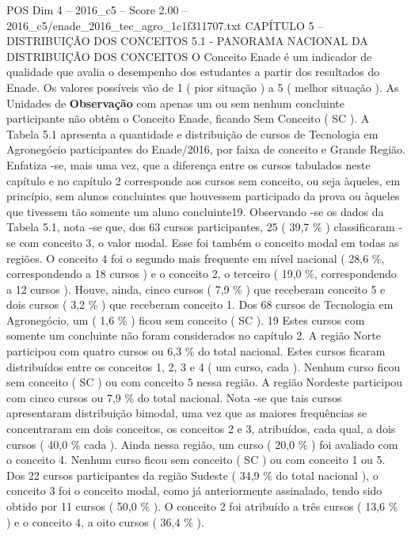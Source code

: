 \begin{textsample}{POS Dim 4 – 2016\_c5 – Score 2.00 – 2016\_c5/enade\_2016\_tec\_agro\_1c1f311707.txt}  \label{ex:f4_pos_109}
CAPÍTULO 5 – DISTRIBUIÇÃO DOS CONCEITOS 5.1 - PANORAMA NACIONAL DA DISTRIBUIÇÃO DOS CONCEITOS O Conceito Enade é um indicador de qualidade que avalia o desempenho dos estudantes a partir dos resultados do Enade.
Os valores possíveis vão de 1 ( pior situação ) a 5 ( melhor situação ).
As Unidades de \textbf{Observação} com apenas um ou sem nenhum concluinte participante não obtêm o Conceito Enade, ficando Sem Conceito ( SC ).
A Tabela 5.1 apresenta a quantidade e distribuição de cursos de Tecnologia em Agronegócio participantes do Enade/2016, por faixa de conceito e Grande Região.
Enfatiza -se, mais uma vez, que a diferença entre os cursos tabulados neste capítulo e no capítulo 2 corresponde aos cursos sem conceito, ou seja àqueles, em princípio, sem alunos concluintes que houvessem participado da prova ou àqueles que tivessem tão somente um aluno concluinte19.
Observando -se os dados da Tabela 5.1, nota -se que, dos 63 cursos participantes, 25 ( 39,7 \% ) classificaram -se com conceito 3, o valor modal.
Esse foi também o conceito modal em todas as regiões.
O conceito 4 foi o segundo mais frequente em nível nacional ( 28,6 \%, correspondendo a 18 cursos ) e o conceito 2, o terceiro ( 19,0 \%, correspondendo a 12 cursos ).
Houve, ainda, cinco cursos ( 7,9 \% ) que receberam conceito 5 e dois cursos ( 3,2 \% ) que receberam conceito 1.
Dos 68 cursos de Tecnologia em Agronegócio, um ( 1,6 \% ) ficou sem conceito ( SC ). 19 Estes cursos com somente um concluinte não foram considerados no capítulo 2.
A região Norte participou com quatro cursos ou 6,3 \% do total nacional.
Estes cursos ficaram distribuídos entre os conceitos 1, 2, 3 e 4 ( um curso, cada ).
Nenhum curso ficou sem conceito ( SC ) ou com conceito 5 nessa região.
A região Nordeste participou com cinco cursos ou 7,9 \% do total nacional.
Nota -se que tais cursos apresentaram distribuição bimodal, uma vez que as maiores frequências se concentraram em dois conceitos, os conceitos 2 e 3, atribuídos, cada qual, a dois cursos ( 40,0 \% cada ).
Ainda nessa região, um curso ( 20,0 \% ) foi avaliado com o conceito 4.
Nenhum curso ficou sem conceito ( SC ) ou com conceito 1 ou 5.
Dos 22 cursos participantes da região Sudeste ( 34,9 \% do total nacional ), o conceito 3 foi o conceito modal, como já anteriormente assinalado, tendo sido obtido por 11 cursos ( 50,0 \% ).
O conceito 2 foi atribuído a três cursos ( 13,6 \% ) e o conceito 4, a oito cursos ( 36,4 \% ).

\end{textsample}

